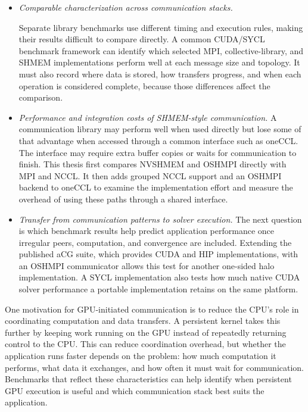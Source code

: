 \begin{itemize}
\item \emph{Comparable characterization across communication stacks.}

Separate library benchmarks use different timing and execution rules, making their results difficult to compare directly. A common CUDA/SYCL benchmark framework can identify which selected MPI, collective-library, and SHMEM implementations perform well at each message size and topology. It must also record where data is stored, how transfers progress, and when each operation is considered complete, because those differences affect the comparison.

\item \emph{Performance and integration costs of SHMEM-style communication.}
A communication library may perform well when used directly but lose some of that advantage when accessed through a common interface such as oneCCL. The interface may require extra buffer copies or waits for communication to finish. This thesis first compares NVSHMEM and OSHMPI directly with MPI and NCCL. It then adds grouped NCCL support and an OSHMPI backend to oneCCL to examine the implementation effort and measure the overhead of using these paths through a shared interface.

\item \emph{Transfer from communication patterns to solver execution.}
The next question is which benchmark results help predict application performance once irregular peers, computation, and convergence are included. Extending the published \ac{aCG} suite, which provides CUDA and \ac{HIP} implementations, with an OSHMPI communicator allows this test for another one-sided halo implementation. A SYCL implementation also tests how much native CUDA solver performance a portable implementation retains on the same platform.
\end{itemize}

\begin{keypoint}

One motivation for GPU-initiated communication is to reduce the CPU's role in coordinating computation and data transfers. A persistent kernel takes this further by keeping work running on the GPU instead of repeatedly returning control to the CPU. This can reduce coordination overhead, but whether the application runs faster depends on the problem: how much computation it performs, what data it exchanges, and how often it must wait for communication. Benchmarks that reflect these characteristics can help identify when persistent GPU execution is useful and which communication stack best suits the application.

\end{keypoint}


